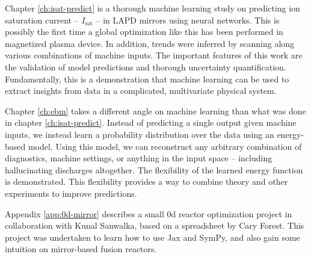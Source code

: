 Chapter \ref{ch:isat-predict} is a thorough machine learning study on predicting ion saturation current -- $I_\text{sat}$ -- in LAPD mirrors using neural networks. This is possibly the first time a global optimization like this has been performed in magnetized plasma device. In addition, trends were inferred by scanning along various combinations of machine inputs. The important features of this work are the validation of model predictions and thorough uncertainty quantification. Fundamentally, this is a demonstration that machine learning can be used to extract insights from data in a complicated, multivariate physical system. 

Chapter \ref{ch:ebm} takes a different angle on machine learning than what was done in chapter \ref{ch:isat-predict}. Instead of predicting a single output given machine inputs, we instead learn a probability distribution over the data using an energy-based model. Using this model, we can reconstruct any arbitrary combination of diagnostics, machine settings, or anything in the input space -- including hallucinating discharges altogether. The flexibility of the learned energy function is demonstrated. This flexibility provides a way to combine theory and other experiments to improve predictions. 

Appendix \ref{app:0d-mirror} describes a small 0d reactor optimization project in collaboration with Kunal Sanwalka, based on a spreadsheet by Cary Forest. This project was undertaken to learn how to use Jax and SymPy, and also gain some intuition on mirror-based fusion reactors.
